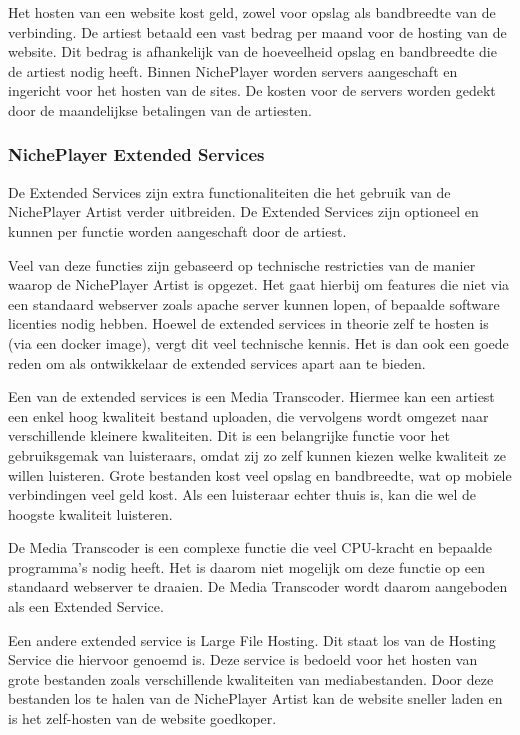 Het hosten van een website kost geld, zowel voor opslag als bandbreedte van de verbinding. De artiest betaald een vast bedrag per maand voor de hosting van de website. Dit bedrag is afhankelijk van de hoeveelheid opslag en bandbreedte die de artiest nodig heeft. Binnen NichePlayer worden servers aangeschaft en ingericht voor het hosten van de sites. De kosten voor de servers worden gedekt door de maandelijkse betalingen van de artiesten.

\subsubsection*{NichePlayer Extended Services}
De Extended Services zijn extra functionaliteiten die het gebruik van de NichePlayer Artist verder uitbreiden. De Extended Services zijn optioneel en kunnen per functie worden aangeschaft door de artiest.

Veel van deze functies zijn gebaseerd op technische restricties van de manier waarop de NichePlayer Artist is opgezet. Het gaat hierbij om features die niet via een standaard webserver zoals apache server kunnen lopen, of bepaalde software licenties nodig hebben. Hoewel de extended services in theorie zelf te hosten is (via een docker image), vergt dit veel technische kennis. Het is dan ook een goede reden om als ontwikkelaar de extended services apart aan te bieden.

Een van de extended services is een Media Transcoder. Hiermee kan een artiest een enkel hoog kwaliteit bestand uploaden, die vervolgens wordt omgezet naar verschillende kleinere kwaliteiten. Dit is een belangrijke functie voor het gebruiksgemak van luisteraars, omdat zij zo zelf kunnen kiezen welke kwaliteit ze willen luisteren. Grote bestanden kost veel opslag en bandbreedte, wat op mobiele verbindingen veel geld kost. Als een luisteraar echter thuis is, kan die wel de hoogste kwaliteit luisteren.

De Media Transcoder is een complexe functie die veel CPU-kracht en bepaalde programma's  nodig heeft. Het is daarom niet mogelijk om deze functie op een standaard webserver te draaien. De Media Transcoder wordt daarom aangeboden als een Extended Service.

Een andere extended service is Large File Hosting. Dit staat los van de Hosting Service die hiervoor genoemd is. Deze service is bedoeld voor het hosten van grote bestanden zoals verschillende kwaliteiten van mediabestanden. Door deze bestanden los te halen van de NichePlayer Artist kan de website sneller laden en is het zelf-hosten van de website goedkoper.

